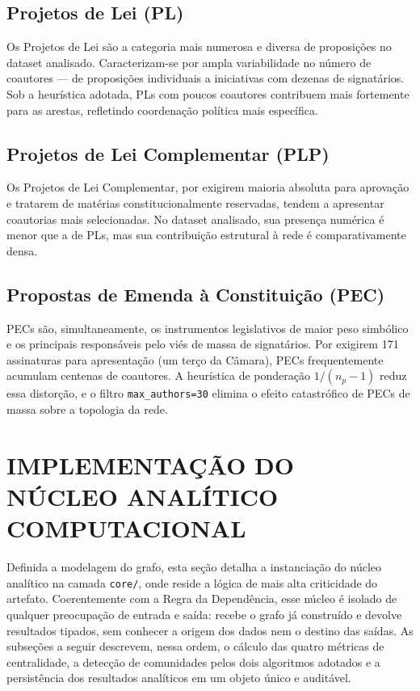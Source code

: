 \documentclass[
      12pt,
      a4paper,
      openright,
      oneside,
      chapter=TITLE,
      section=TITLE,
      english,
      french,
      spanish,
      brazilian
    ]{abntex2}
\begin{document}
    \subsection{Projetos de Lei (PL)}
    
    Os Projetos de Lei são a categoria mais numerosa e diversa de proposições no dataset analisado. Caracterizam-se por ampla variabilidade no número de coautores --- de proposições individuais a iniciativas com dezenas de signatários. Sob a heurística adotada, PLs com poucos coautores contribuem mais fortemente para as arestas, refletindo coordenação política mais específica.
    
    \subsection{Projetos de Lei Complementar (PLP)}
    
    Os Projetos de Lei Complementar, por exigirem maioria absoluta para aprovação e tratarem de matérias constitucionalmente reservadas, tendem a apresentar coautorias mais selecionadas. No dataset analisado, sua presença numérica é menor que a de PLs, mas sua contribuição estrutural à rede é comparativamente densa.
    
    \subsection{Propostas de Emenda à Constituição (PEC)}
    
    PECs são, simultaneamente, os instrumentos legislativos de maior peso simbólico e os principais responsáveis pelo viés de massa de signatários. Por exigirem 171 assinaturas para apresentação (um terço da Câmara), PECs frequentemente acumulam centenas de coautores. A heurística de ponderação $1/(n_p - 1)$ reduz essa distorção, e o filtro \texttt{max\_authors=30} elimina o efeito catastrófico de PECs de massa sobre a topologia da rede.
    
    \section{IMPLEMENTAÇÃO DO NÚCLEO ANALÍTICO COMPUTACIONAL}

    Definida a modelagem do grafo, esta seção detalha a instanciação do núcleo analítico na camada \texttt{core/}, onde reside a lógica de mais alta criticidade do artefato. Coerentemente com a Regra da Dependência, esse núcleo é isolado de qualquer preocupação de entrada e saída: recebe o grafo já construído e devolve resultados tipados, sem conhecer a origem dos dados nem o destino das saídas. As subseções a seguir descrevem, nessa ordem, o cálculo das quatro métricas de centralidade, a detecção de comunidades pelos dois algoritmos adotados e a persistência dos resultados analíticos em um objeto único e auditável.
\end{document}
